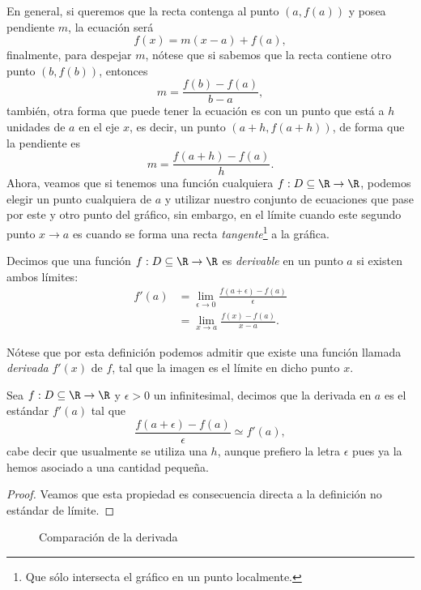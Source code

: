 \documentclass[11pt,oneside,a4paper]{book}
\begin{document}
En general, si queremos que la recta contenga al punto $(a,f(a))$ y posea pendiente $m$, la ecuación será
\begin{equation}
f(x)=m(x-a)+f(a),
\end{equation}
finalmente, para despejar $m$, nótese que si sabemos que la recta contiene otro punto $(b,f(b))$, entonces
\begin{equation}
m=\frac{f(b)-f(a)}{b-a},
\end{equation}
también, otra forma que puede tener la ecuación es con un punto que está a $h$ unidades de $a$ en el eje $x$, es decir, un punto $(a+h,f(a+h))$, de forma que la pendiente es
\begin{equation}
m=\frac{f(a+h)-f(a)}{h}.
\end{equation}
Ahora, veamos que si tenemos una función cualquiera $f:D\subseteq\R\rightarrow\R$, podemos elegir un punto cualquiera de $a$ y utilizar nuestro conjunto de ecuaciones que pase por este y otro punto del gráfico, sin embargo, en el límite cuando este segundo punto $x\to a$ es cuando se forma una recta \textit{tangente}\footnote{Que sólo intersecta el gráfico en un punto localmente.} a la gráfica.
\begin{mydef}[Derivable]
Decimos que una función $f:D\subseteq\R\rightarrow\R$ es \textit{derivable} en un punto $a$ si existen ambos límites:
\begin{align}
f'(a)&=\lim_{\epsilon\to 0}\frac{f(a+\epsilon)-f(a)}{\epsilon}\\
&=\lim_{x\to a}\frac{f(x)-f(a)}{x-a}.
\end{align}
\end{mydef}
Nótese que por esta definición podemos admitir que existe una función llamada \textit{derivada} $f'(x)$ de $f$, tal que la imagen es el límite en dicho punto $x$.
\begin{thm}
Sea $f:D\subseteq\R\rightarrow\R$ y $\epsilon\gt 0$ un infinitesimal, decimos que la derivada en $a$ es el estándar $f'(a)$ tal que
$$\frac{f(a+\epsilon)-f(a)}{\epsilon}\simeq f'(a),$$
cabe decir que usualmente se utiliza una $h$, aunque prefiero la letra $\epsilon$ pues ya la hemos asociado a una cantidad pequeña.
\end{thm}
\begin{proof}
Veamos que esta propiedad es consecuencia directa a la definición no estándar de límite.
\end{proof}
\begin{figure}
\centering
{}
\caption{Comparación de la derivada}
\label{fig:derivative-comparasson}
\end{figure}
\end{document}
